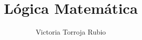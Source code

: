 \documentclass{report}
\begin{document}
\title{Lógica Matemática}
\author{Victoria Torroja Rubio}
\date{}

\maketitle

\tableofcontents

\pagebreak

\end{document}
